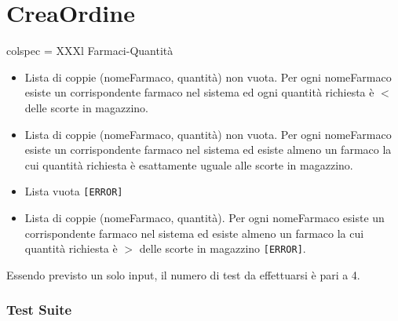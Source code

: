 \section{CreaOrdine}

\begin{table}[!hbp]
	\centering
	\footnotesize
	\begin{partest}{colspec = XXXl}
		Farmaci-Quantità \\
		\begin{itemize}[leftmargin=*]
			\item Lista di coppie (nomeFarmaco, quantità) non vuota. Per ogni nomeFarmaco esiste un corrispondente farmaco nel sistema ed ogni quantità richiesta è $<$ delle scorte in magazzino.
			\item Lista di coppie (nomeFarmaco, quantità) non vuota. Per ogni nomeFarmaco esiste un corrispondente farmaco nel sistema ed esiste almeno un farmaco la cui quantità richiesta è esattamente uguale alle scorte in magazzino.
			\item Lista vuota \texttt{[ERROR]}
			\item Lista di coppie (nomeFarmaco, quantità). Per ogni nomeFarmaco esiste un corrispondente farmaco nel sistema ed esiste almeno un farmaco la cui quantità richiesta è $>$ delle scorte in magazzino \texttt{[ERROR]}.
		\end{itemize}
	\end{partest}
\end{table}

\noindent Essendo previsto un solo input, il numero di test da effettuarsi è pari a 4.

\subsubsection*{Test Suite}

